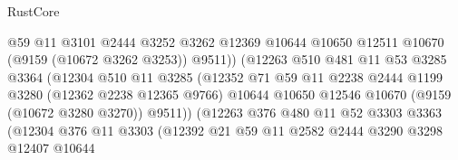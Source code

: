 \begin{lexlean}{RustCore}
\begin{coremodule}
                                    @59
                                    @11
                                    @3101
                                    @2444
                                    @3252
                                    @3262
                                    @12369
                                    @10644
                                    @10650
                                    @12511
                                    @10670
                                    (@9159 (@10672 @3262 @3253))
                                    @9511))
                                (@12263
                                  @510
                                  @481
                                  @11
                                  @53
                                  @3285
                                  @3364
                                  (@12304
                                    @510
                                    @11
                                    @3285
                                    (@12352
                                      @71
                                      @59
                                      @11
                                      @2238
                                      @2444
                                      @1199
                                      @3280
                                      (@12362 @2238 @12365 @9766)
                                      @10644
                                      @10650
                                      @12546
                                      @10670
                                      (@9159 (@10672 @3280 @3270))
                                      @9511))
                                  (@12263
                                    @376
                                    @480
                                    @11
                                    @52
                                    @3303
                                    @3363
                                    (@12304
                                      @376
                                      @11
                                      @3303
                                      (@12392
                                        @21
                                        @59
                                        @11
                                        @2582
                                        @2444
                                        @3290
                                        @3298
                                        @12407
                                        @10644

\end{coremodule}
\end{lexlean}
